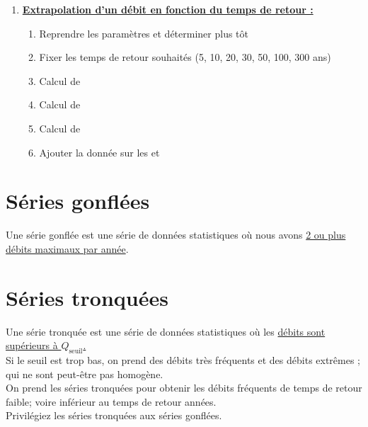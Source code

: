 \begin{enumerate}
\begin{enumerate}
\begin{itemize}
            \item {}
            \item {}
        \end{itemize}
    \end{enumerate}
    \bigskip
    \item \textbf{\underline{Extrapolation d'un débit en fonction du temps de retour :}}
    \begin{enumerate}
        \item Reprendre les paramètres  et  déterminer plus tôt
        \item Fixer les temps de retour  souhaités (5, 10, 20, 30, 50, 100, 300 ans)
        \item Calcul de 
        \item Calcul de 
        \item Calcul de 
        \item Ajouter la donnée  sur les  et 
    \end{enumerate}
\end{enumerate}




\section{Séries gonflées}
Une série gonflée est une série de données statistiques où nous avons \underline{2 ou plus débits maximaux par année}.

\section{Séries tronquées}
Une série tronquée est une série de données statistiques où les \underline{débits sont supérieurs à $Q_\text{seuil}$.} \\
\Warning Si le seuil est trop bas, on prend des débits très fréquents et des débits extrêmes ; qui ne sont peut-être pas homogène. \\
On prend les séries tronquées pour obtenir les débits fréquents de temps de retour faible; voire inférieur au temps de retour années. \\
Privilégiez les séries tronquées aux séries gonflées.